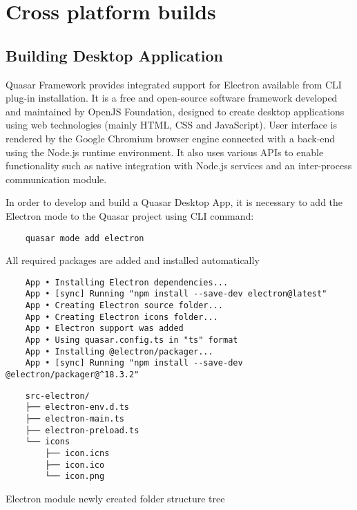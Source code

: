 \chapter{{Cross platform builds}}%
\label{ch:deploy}

\section{{Building Desktop Application}}%
\label{sec:desktop}

Quasar Framework provides integrated support for Electron available from CLI plug-in installation. It is a free and open-source software framework developed and maintained by OpenJS Foundation, designed to create desktop applications using web technologies (mainly HTML, CSS and JavaScript).  User interface is rendered by the Google Chromium browser engine connected with a back-end using the Node.js runtime environment. It also uses various APIs to enable functionality such as native integration with Node.js services and an inter-process communication module.

In order to develop and build a Quasar Desktop App, it is necessary to add the Electron mode to the Quasar project using CLI command:
\begin{verbatim}
    quasar mode add electron
\end{verbatim}
All required packages are added and installed automatically

\begin{verbatim}
    App • Installing Electron dependencies...
    App • [sync] Running "npm install --save-dev electron@latest"
    App • Creating Electron source folder...
    App • Creating Electron icons folder...
    App • Electron support was added
    App • Using quasar.config.ts in "ts" format
    App • Installing @electron/packager...
    App • [sync] Running "npm install --save-dev @electron/packager@^18.3.2"
\end{verbatim}


\begin{listing}[H]
    \begin{verbatim}
    src-electron/
    ├── electron-env.d.ts
    ├── electron-main.ts
    ├── electron-preload.ts
    └── icons
        ├── icon.icns
        ├── icon.ico
        └── icon.png
    \end{verbatim}
\caption[Electron module folder structure tree]{Electron module newly created folder structure tree}
\end{listing}

